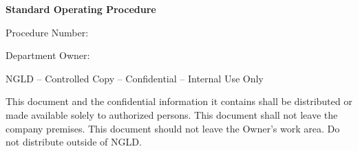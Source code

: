\begin{titlepage}

    \textbf{Standard Operating Procedure}

    \vspace*{1in}

    \begin{flushright}
        {\Huge\textbf{\titleStr}}

        \vspace*{1ex}

        {\Large Procedure Number:~\procedureNumber}

        \vspace*{1ex}

        {\Large Department Owner:~\departmentOwner}
    \end{flushright}
    \vspace{4in}

    NGLD – Controlled Copy – Confidential – Internal Use Only

    This document and the confidential information it contains shall be distributed or
    made available solely to authorized persons. This document shall not leave the company
    premises. This document should not leave the Owner’s work area. Do not distribute
    outside of NGLD.

\end{titlepage}
